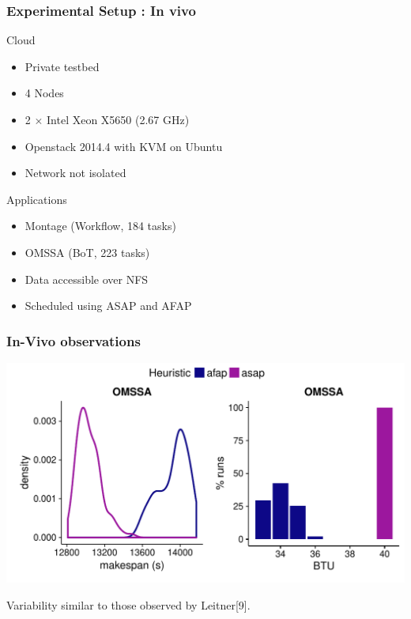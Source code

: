 \documentclass{beamer}
\begin{document}
\begin{frame}
	\frametitle{Experimental Setup : In vivo}
	\begin{block}{Cloud}
	\begin{itemize}
		\item{} Private testbed
		\item{} 4 Nodes
		\item{} 2 $\times$ Intel Xeon X5650 (2.67 GHz)
		\item{} Openstack 2014.4 with KVM on Ubuntu
		\item{} Network not isolated
	\end{itemize}
	\end{block}
	\begin{block}{Applications}
	\begin{itemize}
		\item{} Montage (Workflow, 184 tasks)
		\item{} OMSSA (BoT, 223 tasks)
		\item{} Data accessible over NFS
		\item{} Scheduled using ASAP and AFAP
	\end{itemize}
	\end{block}
\end{frame}

\begin{frame}
	\frametitle{In-Vivo observations}
	\includegraphics[width=\textwidth]{gfx/real.pdf}
	\pause
	\begin{center}
	Variability similar to those observed by Leitner[9].
	\end{center}
\end{frame}
\end{document}
